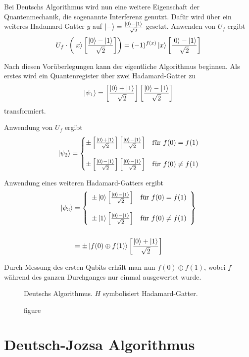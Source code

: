 \documentclass{acm_proc_article-sp}
\begin{document}
\newcommand{\qbitH}[1]{\left[\frac{\qreg 0 #1 \qreg 1}{\sqrt 2}\right]}

Bei Deutschs Algorithmus wird nun eine weitere Eigenschaft der Quantenmechanik, die
sogenannte Interferenz genutzt. Dafür wird über ein weiteres Hadamard-Gatter $y$ auf $\left|-\right\rangle = \frac{\left|0\right\rangle - \left|1\right\rangle}{\sqrt 2}$
gesetzt. Anwenden von $U_f$ ergibt
\begin{equation}
    U_f \cdot \left( \qreg x \qbitH - \right) = (-1)^{f(x)} \qreg x \qbitH - 
\end{equation}

Nach diesen Vorüberlegungen kann der eigentliche Algorithmus beginnen.
Als erstes wird ein Quantenregister  über zwei Hadamard-Gatter zu 
\begin{equation}
\qreg {\psi_1} = \qbitH+\qbitH- 
\end{equation}
transformiert.

Anwendung von $U_f$ ergibt 
\begin{equation}
    \qreg{\psi_2} = \begin{cases}
        \pm \qbitH+ \qbitH- & \text{für } f(0) = f(1) \\[1.5em]
        \pm \qbitH- \qbitH- & \text{für } f(0) \neq f(1)
        \end{cases}
\end{equation}

Anwendung eines weiteren Hadamard-Gatters ergibt
\begin{equation}
    \begin{split}
        \qreg{\psi_3} &= \left\{\begin{array}{lr}
            \pm \qreg 0 \qbitH- & \text{für } f(0) = f(1) \\[1.5em]
            \pm \qreg 1 \qbitH- & \text{für } f(0) \neq f(1) 
        \end{array}\right\} \\[1.5em] &= \pm \qreg{f(0) \oplus f(1)} \qbitH+
    \end{split}
\end{equation}

Durch Messung des ersten Qubits erhält man nun $f(0) \oplus f(1)$, wobei $f$ während des
ganzen Durchganges nur einmal ausgewertet wurde.

\begin{figure}
    \pictureDeutschAlgo
    \caption{figure}{Deutschs Algorithmus. $H$ symbolisiert Hadamard-Gatter.}
\end{figure}

\section{Deutsch-Jozsa Algorithmus}
\end{document}
